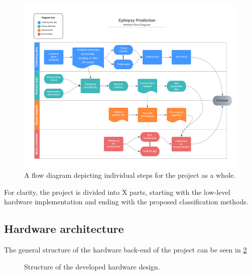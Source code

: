 

\begin{figure} [H]
\begin{center}
\includegraphics[width=0.7\textheight]{images/Epilepsy Prediction, method flow chart.png}
   \caption{A flow diagram depicting individual steps for the project as a whole.}
    \label{fig:flowmethod}
\end{center}
\end{figure}

For clarity, the project is divided into X parts, starting with the low-level hardware implementation and ending with the proposed classification methods.

\subsection{Hardware architecture}
The general structure of the hardware back-end of the project can be seen in \ref{fig:hw_struct}
\begin{figure} [H]
\begin{center}

   \caption{Structure of the developed hardware design.}
    \label{fig:hw_struct}
\end{center}
\end{figure}

